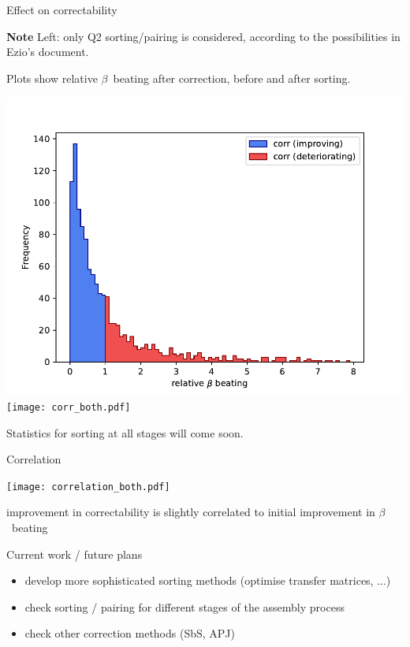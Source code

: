 \documentclass[usenames,dvipsnames,aspectratio=169,table]{beamer}
\begin{document}
\begin{frame} %
    {Effect on correctability}


    \textbf{Note} Left: only Q2 sorting/pairing is considered, according to the possibilities in Ezio's document.

    Plots show relative $\beta$~beating after correction, before and after sorting.
    
    
    \includegraphics[width=0.45\linewidth]{corr_onlyQ2.pdf}
    \hfill
    \texttt{[image: corr\_both.pdf]}

    Statistics for sorting at all stages will come soon.

\end{frame} %


\begin{frame} %
    {Correlation}

    \begin{minipage}{0.6\linewidth}
        \texttt{[image: correlation\_both.pdf]} 
    \end{minipage}
    \begin{minipage}{0.39\linewidth}
        improvement in correctability is slightly correlated to initial improvement in $\beta$~beating 
    \end{minipage}
    
\end{frame} %


\begin{frame} %
    {Current work / future plans}


    \begin{itemize}
        \item develop more sophisticated sorting methods (optimise transfer matrices, ...)
        \item check sorting / pairing for different stages of the assembly process
        \item check other correction methods (SbS, APJ)
    \end{itemize}
    
\end{frame} %
\end{document}
